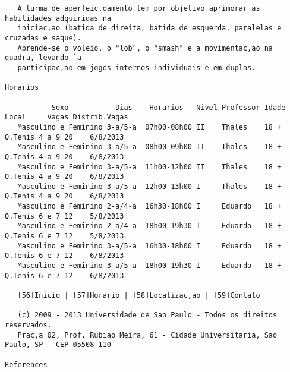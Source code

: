 \documentclass[brazil]{article}
\begin{document}
\begin{small}
\begin{verbatim}
   A turma de aperfeic,oamento tem por objetivo aprimorar as habilidades adquiridas na
   iniciac,ao (batida de direita, batida de esquerda, paralelas e cruzadas e saque).
   Aprende-se o voleio, o "lob", o "smash" e a movimentac,ao na quadra, levando `a
   participac,ao em jogos internos individuais e em duplas.

Horarios

           Sexo           Dias    Horarios   Nivel Professor Idade     Local     Vagas Distrib.Vagas
   Masculino e Feminino 3-a/5-a  07h00-08h00 II    Thales    18 +  Q.Tenis 4 a 9 20    6/8/2013
   Masculino e Feminino 3-a/5-a  08h00-09h00 II    Thales    18 +  Q.Tenis 4 a 9 20    6/8/2013
   Masculino e Feminino 3-a/5-a  11h00-12h00 II    Thales    18 +  Q.Tenis 4 a 9 20    6/8/2013
   Masculino e Feminino 3-a/5-a  12h00-13h00 I     Thales    18 +  Q.Tenis 4 a 9 20    6/8/2013
   Masculino e Feminino 2-a/4-a  16h30-18h00 I     Eduardo   18 +  Q.Tenis 6 e 7 12    5/8/2013
   Masculino e Feminino 2-a/4-a  18h00-19h30 I     Eduardo   18 +  Q.Tenis 6 e 7 12    5/8/2013
   Masculino e Feminino 3-a/5-a  16h30-18h00 I     Eduardo   18 +  Q.Tenis 6 e 7 12    6/8/2013
   Masculino e Feminino 3-a/5-a  18h00-19h30 I     Eduardo   18 +  Q.Tenis 6 e 7 12    6/8/2013

   [56]Inicio | [57]Horario | [58]Localizac,ao | [59]Contato

   (c) 2009 - 2013 Universidade de Sao Paulo - Todos os direitos reservados.
   Prac,a 02, Prof. Rubiao Meira, 61 - Cidade Universitaria, Sao Paulo, SP - CEP 05508-110

References


\end{verbatim}
\end{small}
\end{document}
